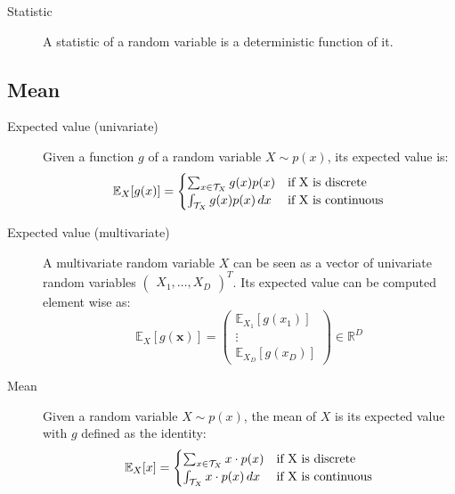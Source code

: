 \begin{description}
    \item[Statistic] 
        A statistic of a random variable is a deterministic function of it. 
\end{description}


\subsection{Mean}
\begin{description}
    \item[Expected value (univariate)] 
        Given a function $g$ of a random variable $X \sim p(x)$,
        its expected value is:
        \[ 
            \mathbb{E}_X[g(x)] = 
            \begin{cases}
                \sum_{x \in \mathcal{T}_X} g(x)p(x) & \text{if } $X$ \text{ is discrete} \\
                \int_{\mathcal{T}_X} g(x)p(x) \,dx  & \text{if } $X$ \text{ is continuous} \\
            \end{cases}
        \]

    \item[Expected value (multivariate)] 
        A multivariate random variable $X$ can be seen as 
        a vector of univariate random variables $\begin{pmatrix} X_1, \dots, X_D \end{pmatrix}^T$.
        Its expected value can be computed element wise as:
        \[ 
            \mathbb{E}_X[g(\bm{x})] = 
            \begin{pmatrix} \mathbb{E}_{X_1}[g(x_1)] \\ \vdots \\ \mathbb{E}_{X_D}[g(x_D)] \end{pmatrix} \in \mathbb{R}^D
        \]

    \item[Mean] 
        Given a random variable $X \sim p(x)$,
        the mean of $X$ is its expected value with $g$ defined as the identity:
        \[ 
            \mathbb{E}_X[x] = 
            \begin{cases}
                \sum_{x \in \mathcal{T}_X} x \cdot p(x) & \text{if } $X$ \text{ is discrete} \\
                \int_{\mathcal{T}_X} x \cdot p(x) \,dx  & \text{if } $X$ \text{ is continuous} \\
            \end{cases}
        \]
\end{description}


